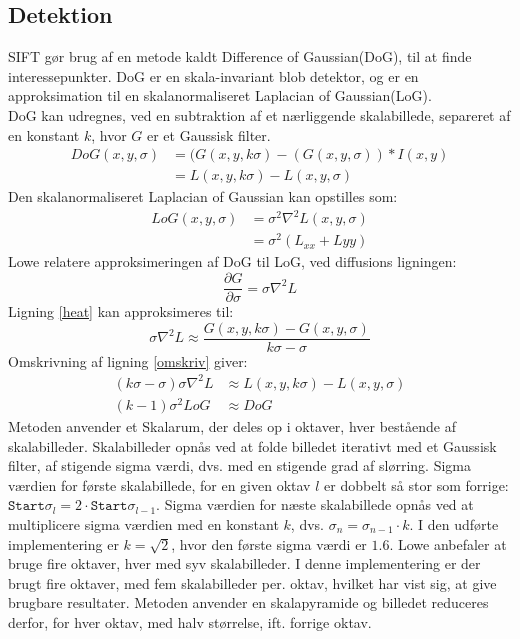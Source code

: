 \subsection{Detektion}
SIFT gør brug af en metode kaldt Difference of Gaussian(DoG), til at finde interessepunkter. DoG er en skala-invariant blob detektor, og er en approksimation til en skalanormaliseret Laplacian of Gaussian(LoG). \\ DoG kan udregnes, ved en subtraktion af et nærliggende skalabillede, separeret af en konstant $k$, hvor $G$ er et Gaussisk filter.
\begin{equation}
\begin{split}
DoG(x,y,\sigma) &= (G(x,y,k\sigma)-(G(x,y,\sigma))\ast I(x,y) \\
           &= L(x,y,k \sigma)-L(x,y,\sigma)
\end{split}
\label{dog}
\end{equation}
Den skalanormaliseret Laplacian of Gaussian kan opstilles som:
\begin{equation}
\begin{split}
LoG(x,y,\sigma)&=\sigma^2\nabla^2L(x,y,\sigma) \\
&= \sigma^2(L_{xx}+L{yy})
\end{split}
\end{equation}
Lowe relatere approksimeringen af DoG til LoG, ved diffusions ligningen:
\begin{equation}
\dfrac{\partial G}{\partial \sigma} = \sigma \nabla^2L
\label{heat}
\end{equation}
Ligning \eqref{heat} kan approksimeres til:
\begin{equation}
\sigma \nabla^2L \approx \frac{G(x,y,k\sigma) - G(x,y,\sigma)}{k\sigma-\sigma}
\label{omskriv}
\end{equation}
Omskrivning af ligning \eqref{omskriv} giver:
\begin{equation}
\begin{split}
(k\sigma-\sigma)\sigma\nabla^2L &\approx L(x,y,k\sigma)-L(x,y,\sigma) \\
(k-1)\sigma^2LoG &\approx DoG
\end{split}
\end{equation}
Metoden anvender et Skalarum, der deles op i oktaver, hver bestående af skalabilleder. Skalabilleder opnås ved at folde billedet iterativt med et Gaussisk filter, af stigende sigma værdi, dvs. med en stigende grad af slørring. Sigma værdien for første skalabillede, for en given oktav $l$ er dobbelt så stor som forrige: $\texttt{Start} \sigma_l = 2 \cdot \texttt{Start} \sigma_{l-1}$. Sigma værdien for næste skalabillede opnås ved at multiplicere sigma værdien med en konstant $k$, dvs. $\sigma_n = \sigma_{n-1} \cdot k$. I den udførte implementering er $k=\sqrt{2}$, hvor den første sigma værdi er $1.6$. Lowe anbefaler at bruge fire oktaver, hver med syv skalabilleder. I denne implementering er der brugt fire oktaver, med fem skalabilleder per. oktav, hvilket har vist sig, at give brugbare resultater. Metoden anvender en skalapyramide og billedet reduceres derfor, for hver oktav, med halv størrelse, ift. forrige oktav. \\ 
